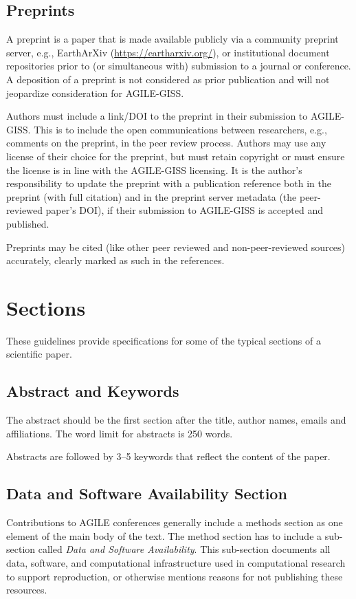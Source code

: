 \documentclass[agile, final]{copernicus-agile}
\begin{document}
\subsection{Preprints}
A preprint is a paper that is made available publicly via a community preprint server, e.g., EarthArXiv (\url{https://eartharxiv.org/}), or institutional document repositories prior to (or simultaneous with) submission to a journal or conference. A deposition of a preprint is not considered as prior publication and will not jeopardize consideration for AGILE-GISS.

Authors must include a link/DOI to the preprint in their submission to AGILE-GISS. This is to include the open communications between researchers, e.g., comments on the preprint, in the peer review process. Authors may use any license of their choice for the preprint, but must retain copyright or must ensure the license is in line with the AGILE-GISS licensing. It is the author’s responsibility to update the preprint with a publication reference both in the preprint (with full citation) and in the preprint server metadata (the peer-reviewed paper’s DOI), if their submission to AGILE-GISS is accepted and published.

Preprints may be cited (like other peer reviewed and non-peer-reviewed sources) accurately, clearly marked as such in the references.

\section{Sections}
These guidelines provide specifications for some of the typical sections of a scientific paper.

\subsection{Abstract and Keywords}
The abstract should be the first section after the title, author names, emails and affiliations. The word limit for abstracts is 250 words.

Abstracts are followed by 3--5 keywords that reflect the content of the paper.

\subsection{Data and Software Availability Section}
Contributions to AGILE conferences generally include a methods section as one element of the main body of the text. The method section has to include a sub-section called \textit{Data and Software Availability}. This sub-section documents all data, software, and computational infrastructure used in computational research to support reproduction, or otherwise mentions reasons for not publishing these resources.
\end{document}
